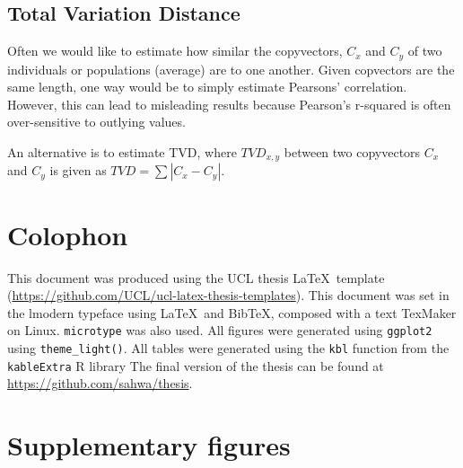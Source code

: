 \section{Total Variation Distance} \label{sec:appendixTVD}

Often we would like to estimate how similar the copyvectors, $C_{x}$ and $C_{y}$ of two individuals or populations (average) are to one another. Given copvectors are the same length, one way would be to simply estimate Pearsons' correlation. However, this can lead to misleading results because Pearson's r-squared is often over-sensitive to outlying values.  

An alternative is to estimate TVD, where $TVD_{x,y}$ between two copyvectors $C_{x}$ and $C_{y}$ is given as $TVD = \sum |C_{x} - C_{y}|$. 




\chapter{Colophon}
\label{appendixlabel3}
\noindent
This document was produced using the UCL thesis \LaTeX\ template (\url{https://github.com/UCL/ucl-latex-thesis-templates}).
\noindent
This document was set in the lmodern typeface using \LaTeX\ and Bib\TeX, composed with a text TexMaker on Linux. \texttt{microtype} was also used.
\noindent
All figures were generated using \texttt{ggplot2} using \texttt{theme\_light()}.
\noindent
All tables were generated using the \texttt{kbl} function from the \texttt{kableExtra} R library
\noindent
The final version of the thesis can be found at \url{https://github.com/sahwa/thesis}.

\chapter{Supplementary figures}
\label{appendixlabel4}

